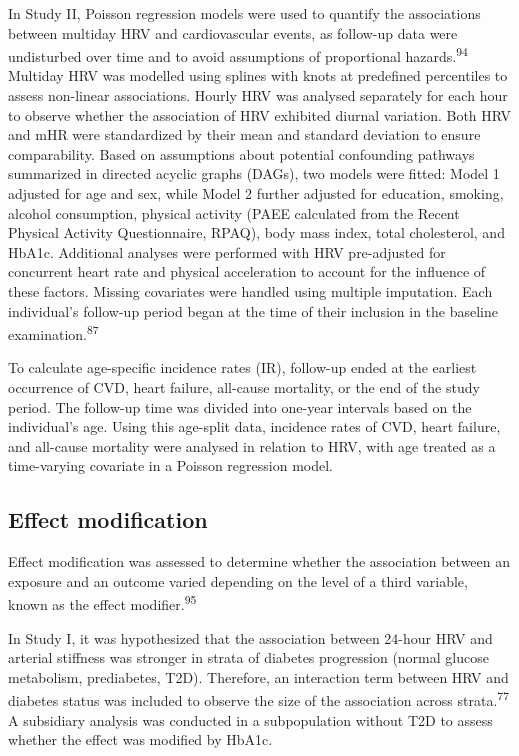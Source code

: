 \documentclass[
  a4paper,
  headsepline=true,
  open=left]{scrbook}
\begin{document}
In Study II, Poisson regression models were used to quantify the
associations between multiday HRV and cardiovascular events, as
follow-up data were undisturbed over time and to avoid assumptions of
proportional hazards.\textsuperscript{94} Multiday HRV was modelled
using splines with knots at predefined percentiles to assess non-linear
associations. Hourly HRV was analysed separately for each hour to
observe whether the association of HRV exhibited diurnal variation. Both
HRV and mHR were standardized by their mean and standard deviation to
ensure comparability. Based on assumptions about potential confounding
pathways summarized in directed acyclic graphs (DAGs), two models were
fitted: Model 1 adjusted for age and sex, while Model 2 further adjusted
for education, smoking, alcohol consumption, physical activity (PAEE
calculated from the Recent Physical Activity Questionnaire, RPAQ), body
mass index, total cholesterol, and HbA1c. Additional analyses were
performed with HRV pre-adjusted for concurrent heart rate and physical
acceleration to account for the influence of these factors. Missing
covariates were handled using multiple imputation. Each individual's
follow-up period began at the time of their inclusion in the baseline
examination.\textsuperscript{87}

To calculate age-specific incidence rates (IR), follow-up ended at the
earliest occurrence of CVD, heart failure, all-cause mortality, or the
end of the study period. The follow-up time was divided into one-year
intervals based on the individual's age. Using this age-split data,
incidence rates of CVD, heart failure, and all-cause mortality were
analysed in relation to HRV, with age treated as a time-varying
covariate in a Poisson regression model.

\hypertarget{effect-modification}{%
\subsection{Effect modification}\label{effect-modification}}

Effect modification was assessed to determine whether the association
between an exposure and an outcome varied depending on the level of a
third variable, known as the effect modifier.\textsuperscript{95}

In Study I, it was hypothesized that the association between 24-hour HRV
and arterial stiffness was stronger in strata of diabetes progression
(normal glucose metabolism, prediabetes, T2D). Therefore, an interaction
term between HRV and diabetes status was included to observe the size of
the association across strata.\textsuperscript{77} A subsidiary analysis
was conducted in a subpopulation without T2D to assess whether the
effect was modified by HbA1c.
\end{document}
